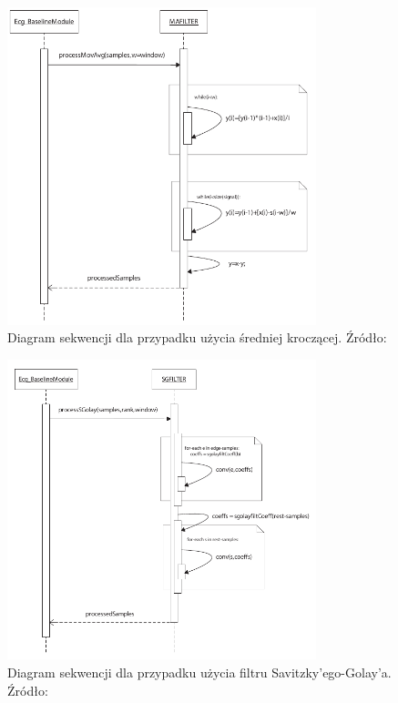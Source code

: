 \begin{figure}[H]
\centering
	\includegraphics[width=0.8\textwidth]{ECG_BASELINE/figures/ma_seq.pdf}
\caption{Diagram sekwencji dla przypadku użycia średniej kroczącej. Źródło: \cite{Baseline2013}}
\label{MA-seq}
\end{figure}

\begin{figure}[H]
\centering
	\includegraphics[width=0.8\textwidth]{ECG_BASELINE/figures/sg_seq.pdf}
\caption{Diagram sekwencji dla przypadku użycia filtru Savitzky'ego-Golay'a. Źródło: \cite{Baseline2013}}
\label{MA-seq}
\end{figure}




